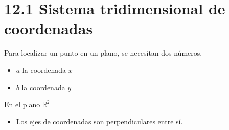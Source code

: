 \section{12.1 Sistema tridimensional de coordenadas}
Para localizar un punto en un plano, se necesitan dos números. 
\begin{itemize}
    \item $a$ la coordenada $x$ 
    \item $b$ la coordenada $y$ 
\end{itemize}
En el plano $\displaystyle \mathbb{R}^2$ 

\begin{itemize}
    \item Los ejes de coordenadas son perpendiculares entre sí.
\end{itemize}

